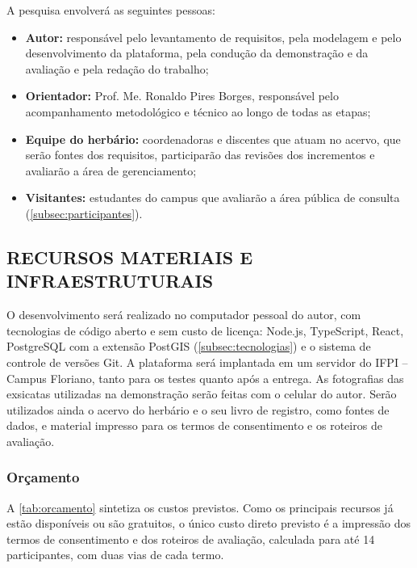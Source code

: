 \documentclass[
    12pt,        %
    openany,     %
    oneside,     %
    a4paper,     %
    english,     %
    french,      %
    spanish,     %
    brazil,      %
    article      %
]{abntex2}
\begin{document}
A pesquisa envolverá as seguintes pessoas:

\begin{itemize}
    \item \textbf{Autor:} responsável pelo levantamento de requisitos, pela modelagem e pelo desenvolvimento da plataforma, pela condução da demonstração e da avaliação e pela redação do trabalho;
    \item \textbf{Orientador:} Prof. Me. Ronaldo Pires Borges, responsável pelo acompanhamento metodológico e técnico ao longo de todas as etapas;
    \item \textbf{Equipe do herbário:} coordenadoras e discentes que atuam no acervo, que serão fontes dos requisitos, participarão das revisões dos incrementos e avaliarão a área de gerenciamento;
    \item \textbf{Visitantes:} estudantes do campus que avaliarão a área pública de consulta (\autoref{subsec:participantes}).
\end{itemize}

\subsection{RECURSOS MATERIAIS E INFRAESTRUTURAIS}
\label{subsec:recursos-materiais}

O desenvolvimento será realizado no computador pessoal do autor, com tecnologias de código aberto e sem custo de licença: Node.js, TypeScript, React, PostgreSQL com a extensão PostGIS (\autoref{subsec:tecnologias}) e o sistema de controle de versões Git. A plataforma será implantada em um servidor do IFPI -- Campus Floriano, tanto para os testes quanto após a entrega. As fotografias das exsicatas utilizadas na demonstração serão feitas com o celular do autor. Serão utilizados ainda o acervo do herbário e o seu livro de registro, como fontes de dados, e material impresso para os termos de consentimento e os roteiros de avaliação.

\subsubsection{Orçamento}
\label{subsubsec:orcamento}

A \autoref{tab:orcamento} sintetiza os custos previstos. Como os principais recursos já estão disponíveis ou são gratuitos, o único custo direto previsto é a impressão dos termos de consentimento e dos roteiros de avaliação, calculada para até 14 participantes, com duas vias de cada termo.
\end{document}
